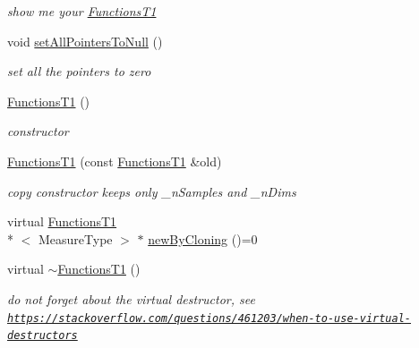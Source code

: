 \begin{DoxyCompactItemize}
\begin{DoxyCompactList}\small\item\em show me your \hyperlink{class_ox_1_1_functions_t1}{Functions\-T1} \end{DoxyCompactList}\item 
\hypertarget{class_ox_1_1_functions_t1_a242f775b52419858f76d7711096ac5dc}{void \hyperlink{class_ox_1_1_functions_t1_a242f775b52419858f76d7711096ac5dc}{set\-All\-Pointers\-To\-Null} ()}\label{class_ox_1_1_functions_t1_a242f775b52419858f76d7711096ac5dc}

\begin{DoxyCompactList}\small\item\em set all the pointers to zero \end{DoxyCompactList}\item 
\hypertarget{class_ox_1_1_functions_t1_a7dae9dc71ec97e9eef1308c9937aaaf0}{\hyperlink{class_ox_1_1_functions_t1_a7dae9dc71ec97e9eef1308c9937aaaf0}{Functions\-T1} ()}\label{class_ox_1_1_functions_t1_a7dae9dc71ec97e9eef1308c9937aaaf0}

\begin{DoxyCompactList}\small\item\em constructor \end{DoxyCompactList}\item 
\hyperlink{class_ox_1_1_functions_t1_a8b14d232e9136a64ea3ae8f7a162daad}{Functions\-T1} (const \hyperlink{class_ox_1_1_functions_t1}{Functions\-T1} \&old)
\begin{DoxyCompactList}\small\item\em copy constructor keeps only \-\_\-n\-Samples and \-\_\-n\-Dims \end{DoxyCompactList}\item 
virtual \hyperlink{class_ox_1_1_functions_t1}{Functions\-T1}\\*
$<$ Measure\-Type $>$ $\ast$ \hyperlink{class_ox_1_1_functions_t1_a2246ea540016c650d5a18100697eacb8}{new\-By\-Cloning} ()=0
\item 
\hypertarget{class_ox_1_1_functions_t1_a900d5602b3dd10fca760a304e41da9b5}{virtual \hyperlink{class_ox_1_1_functions_t1_a900d5602b3dd10fca760a304e41da9b5}{$\sim$\-Functions\-T1} ()}\label{class_ox_1_1_functions_t1_a900d5602b3dd10fca760a304e41da9b5}

\begin{DoxyCompactList}\small\item\em do not forget about the virtual destructor, see \href{https://stackoverflow.com/questions/461203/when-to-use-virtual-destructors}{\tt https\-://stackoverflow.\-com/questions/461203/when-\/to-\/use-\/virtual-\/destructors} \end{DoxyCompactList}\end{DoxyCompactItemize}
